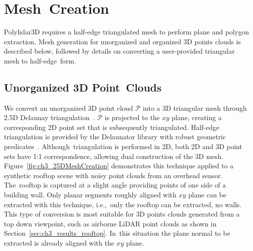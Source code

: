 


\section{Mesh~Creation}\label{sec:ch3_methods_mesh_creation}

Polylidar3D requires a half-edge triangulated mesh to perform plane and polygon extraction. Mesh generation for unorganized and organized 3D points clouds is described below, followed by details on converting a user-provided triangular mesh to half-edge~form.

\subsection{Unorganized 3D Point~Clouds}\label{sec:ch3_methods_mesh_upc}

We convert an unorganized 3D point cloud $\mathcal{P}$ into a 3D triangular mesh through 2.5D Delaunay triangulation~\cite{de_berg_delaunay_2008}. $\mathcal{P}$ is projected to the $xy$ plane, creating a corresponding 2D point set that is subsequently triangulated.  Half-edge triangulation is provided by the Delaunator library with robust geometric predicates~\cite{noauthor_github_2018, richard_shewchuk_adaptive_1997}. Although~triangulation is performed in 2D, both 2D and 3D point sets have 1:1 correspondence, allowing dual construction of the 3D mesh. Figure~\ref{fig:ch3_25DMeshCreation} demonstrates this technique applied to a synthetic rooftop scene with noisy point clouds from an overhead sensor. The~rooftop is captured at a slight angle providing points of one side of a building wall.  Only planar segments roughly aligned with $xy$ plane can be extracted with this technique, i.e.,~only the rooftop can be extracted, no walls. This type of conversion is most suitable for 3D points clouds generated from a top down viewpoint, such as airborne LiDAR point clouds as shown in Section~\ref{sec:ch3_results_rooftop}. In~this situation the plane normal to be extracted is already aligned with the $xy$ plane. 

